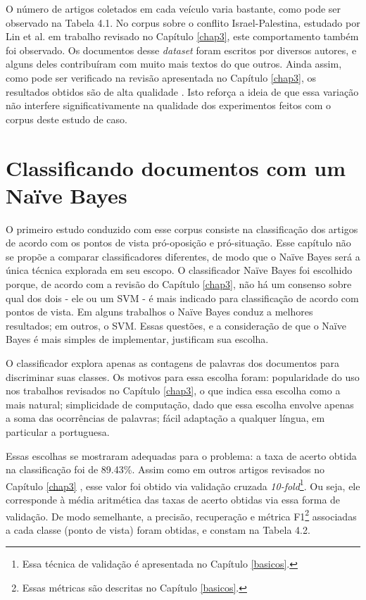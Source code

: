 O número de artigos coletados em cada veículo varia bastante, como pode ser observado na Tabela 4.1. No corpus sobre o conflito Israel-Palestina, estudado por Lin et al. em trabalho revisado no Capítulo \ref{chap3}, este comportamento também foi observado. Os documentos desse \emph{dataset} foram escritos por diversos autores, e alguns deles contribuíram com muito mais textos do que outros. Ainda assim, como pode ser verificado na revisão apresentada no Capítulo \ref{chap3}, os resultados obtidos são de alta qualidade \cite{lin-et-al2006}. Isto reforça a ideia de que essa variação não interfere significativamente na qualidade dos experimentos feitos com o corpus deste estudo de caso.


\section{Classificando documentos com um Naïve Bayes}
\label{estudo:sec2}

O primeiro estudo conduzido com esse corpus consiste na classificação dos artigos de acordo com os pontos de vista pró-oposição e pró-situação. Esse capítulo não se propõe a comparar classificadores diferentes, de modo que o Naïve Bayes será a única técnica explorada em seu escopo. O classificador Naïve Bayes foi escolhido porque, de acordo com a revisão do Capítulo \ref{chap3}, não há um consenso sobre qual dos dois - ele ou um SVM - é mais indicado para classificação de acordo com pontos de vista. Em alguns trabalhos o Naïve Bayes conduz a melhores resultados; em outros, o SVM. Essas questões, e a consideração de que o Naïve Bayes é mais simples de implementar, justificam sua escolha.  

O classificador explora apenas as contagens de palavras dos documentos para discriminar suas classes. Os motivos para essa escolha foram: popularidade do uso nos trabalhos revisados no Capítulo \ref{chap3}, o que indica essa escolha como a mais natural; simplicidade de computação, dado que essa escolha envolve apenas a soma das ocorrências de palavras; fácil adaptação a qualquer língua, em particular a portuguesa. 


Essas escolhas se mostraram adequadas para o problema: a taxa de acerto obtida na classificação foi de 89.43\%. Assim como em outros artigos revisados no Capítulo \ref{chap3} \cite{lin-et-al2006, aaai-politics, klebanov}, esse valor foi obtido via validação cruzada \emph{10-fold}\footnote{Essa técnica de validação é apresentada no Capítulo \ref{basicos}.}. Ou seja, ele corresponde à média aritmética das taxas de acerto obtidas via essa forma de validação. De modo semelhante, a precisão, recuperação e métrica F1\footnote{Essas métricas são descritas no Capítulo \ref{basicos}.}  associadas a cada classe (ponto de vista) foram obtidas, e constam na Tabela 4.2. %

